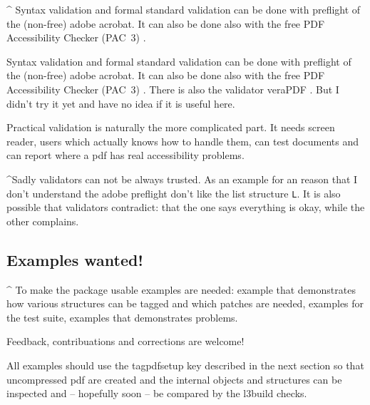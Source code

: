 \documentclass[DIV=12,parskip=half-,bibliography=totoc]{scrartcl}
\begin{document}
\TagP^
Syntax validation and formal standard validation can be done with preflight of the (non-free) adobe acrobat.
It can also be done also with the free PDF Accessibility Checker (PAC~3) \parencite{pac3}.

\TagP
Syntax validation and formal standard validation can be done with preflight of the (non-free) adobe acrobat.
It can also be done also with the free PDF Accessibility Checker (PAC~3) \parencite{pac3}.
There is also the validator veraPDF \parencite{verapdf}. But I didn't try it yet and have no idea if it is useful here.

\TagP Practical validation is naturally the more complicated part. It needs screen reader, users which actually knows how to handle them, can test documents and can report where a pdf has real accessibility problems.\TagPend




\TagP^Sadly validators can not be always trusted. As an example for an reason that I don't understand the adobe preflight don't like the list structure \texttt{L}.
It is also possible that validators contradict: that the one says everything is okay, while the other complains.\TagPend


\subsection{Examples wanted!}
\TagP^ To make the package usable examples are needed: example that demonstrates how various structures can be tagged and which patches are needed, examples for the test suite, examples that demonstrates problems.

\begin{tcolorbox}
\TagP Feedback, contribuations and corrections are welcome!
\end{tcolorbox}

\TagP All examples should use the tagpdfsetup key  described in the next section so that uncompressed pdf are created and the internal objects and structures can be inspected and -- hopefully soon -- be compared by the l3build checks.%
\TagPend

\tagstructend %
\end{document}

